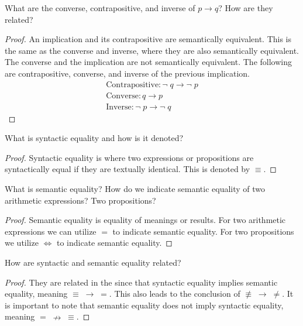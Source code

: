 \documentclass[12pt]{article}
\newenvironment{exercise}[2][Exercise]{\begin{trivlist}
\item[\hskip \labelsep {\bfseries #1}\hskip \labelsep {\bfseries #2.}]}{\end{trivlist}}
\begin{document}
\begin{exercise}{6}
What are the converse, contrapositive, and inverse of $p \rightarrow q$? How are they related? 
\end{exercise}

\begin{proof}
An implication and its contrapositive are semantically equivalent. This is the same as the converse and inverse, where they are also semantically equivalent. The converse and the implication are not semantically equivalent. The following are contrapositive, converse, and inverse of the previous implication. 
\begin{align*}
    \text{Contrapositive}: \neg\; q \rightarrow \neg\; p \\
    \text{Converse}: q \rightarrow p \\ 
    \text{Inverse}: \neg\; p \rightarrow \neg\; q 
\end{align*}
\end{proof}

\begin{exercise}{7}
What is syntactic equality and how is it denoted?
\end{exercise}

\begin{proof}
Syntactic equality is where two expressions or propositions are syntactically equal if they are textually identical. This is denoted by $\equiv$.

\end{proof}

\begin{exercise}{8}
What is semantic equality? How do we indicate semantic equality of two arithmetic expressions? Two propositions? 
\end{exercise}

\begin{proof}
Semantic equality is equality of meanings or results. For two arithmetic expressions we can utilize $=$ to indicate semantic equality. For two propositions we utilize $\Leftrightarrow$ to indicate semantic equality.

\end{proof}

\begin{exercise}{9}
How are syntactic and semantic equality related?
\end{exercise}

\begin{proof}
They are related in the since that syntactic equality implies semantic equality, meaning $\equiv\; \rightarrow\; =$. This also leads to the conclusion of $\not\equiv\; \rightarrow\; \neq$. It is important to note that semantic equality does not imply syntactic equality, meaning $=\; \nrightarrow\; \equiv$.

\end{proof}
\end{document}
